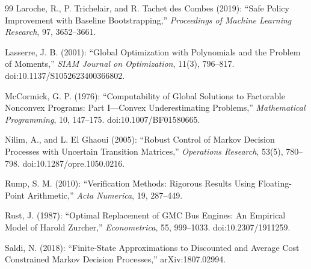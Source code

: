 \begin{thebibliography}{99}
Laroche, R., P. Trichelair, and R. Tachet des Combes (2019): ``Safe Policy Improvement with Baseline Bootstrapping,'' \emph{Proceedings of Machine Learning Research}, 97, 3652--3661.

Lasserre, J. B. (2001): ``Global Optimization with Polynomials and the Problem of Moments,'' \emph{SIAM Journal on Optimization}, 11(3), 796--817. doi:10.1137/S1052623400366802.

McCormick, G. P. (1976): ``Computability of Global Solutions to Factorable Nonconvex Programs: Part I---Convex Underestimating Problems,'' \emph{Mathematical Programming}, 10, 147--175. doi:10.1007/BF01580665.

Nilim, A., and L. El Ghaoui (2005): ``Robust Control of Markov Decision Processes with Uncertain Transition Matrices,'' \emph{Operations Research}, 53(5), 780--798. doi:10.1287/opre.1050.0216.

Rump, S. M. (2010): ``Verification Methods: Rigorous Results Using Floating-Point Arithmetic,'' \emph{Acta Numerica}, 19, 287--449.

Rust, J. (1987): ``Optimal Replacement of GMC Bus Engines: An Empirical Model of Harold Zurcher,'' \emph{Econometrica}, 55, 999--1033. doi:10.2307/1911259.

Saldi, N. (2018): ``Finite-State Approximations to Discounted and Average Cost Constrained Markov Decision Processes,'' arXiv:1807.02994.

\end{thebibliography}
\endgroup
